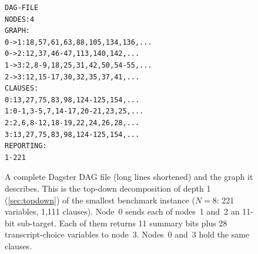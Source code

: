 \documentclass[11pt,a4paper]{article}
\newcommand{\nS}{\mathsf{S}}\newcommand{\nK}{\mathsf{K}}\newcommand{\nC}{\mathsf{C}}
\begin{document}
\begin{figure}[htbp]
\centering
\begin{minipage}{0.55\textwidth}
\small
\begin{verbatim}
DAG-FILE
NODES:4
GRAPH:
0->1:18,57,61,63,88,105,134,136,...
0->2:12,37,46-47,113,140,142,...
1->3:2,8-9,18,25,31,42,50,54-55,...
2->3:12,15-17,30,32,35,37,41,...
CLAUSES:
0:13,27,75,83,98,124-125,154,...
1:0-1,3-5,7,14-17,20-21,23,25,...
2:2,6,8-12,18-19,22,24,26,28,...
3:13,27,75,83,98,124-125,154,...
REPORTING:
1-221
\end{verbatim}
\end{minipage}\hfill
\begin{minipage}{0.4\textwidth}
\centering
{}
\end{minipage}
\caption{A complete Dagster DAG file (long lines shortened) and the graph it describes. This
is the top-down decomposition of depth 1 (\cref{sec:topdown}) of the smallest benchmark
instance ($N=8$: 221 variables, 1{,}111 clauses). Node~0 sends each of nodes~1 and~2 an
11-bit sub-target. Each of them returns 11 summary bits plus 28 transcript-choice variables
to node~3. Nodes~0 and~3 hold the same clauses.}
\label{fig:dagfile}
\end{figure}
\end{document}
